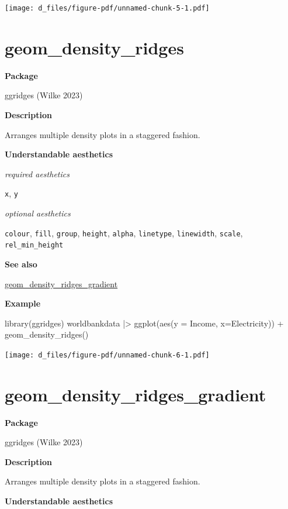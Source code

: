 \documentclass[
  letterpaper,
  DIV=11,
  numbers=noendperiod]{scrreprt}
\newenvironment{Shaded}{\begin{snugshade}}{\end{snugshade}}
\newcommand{\AttributeTok}[1]{\textcolor[rgb]{0.40,0.45,0.13}{#1}}
\newcommand{\FunctionTok}[1]{\textcolor[rgb]{0.28,0.35,0.67}{#1}}
\newcommand{\NormalTok}[1]{\textcolor[rgb]{0.00,0.23,0.31}{#1}}
\newcommand{\SpecialCharTok}[1]{\textcolor[rgb]{0.37,0.37,0.37}{#1}}
\begin{document}
\texttt{[image: d\_files/figure-pdf/unnamed-chunk-5-1.pdf]}

\section{geom\_density\_ridges}\label{density_ridges}

\textbf{Package}

ggridges (Wilke 2023)

\textbf{Description}

Arranges multiple density plots in a staggered fashion.

\textbf{Understandable aesthetics}

\emph{required aesthetics}

\texttt{x}, \texttt{y}

\emph{optional aesthetics}

\texttt{colour}, \texttt{fill}, \texttt{group}, \texttt{height},
\texttt{alpha}, \texttt{linetype}, \texttt{linewidth}, \texttt{scale},
\texttt{rel\_min\_height}

\textbf{See also}

\hyperref[density_ridges_gradient]{geom\_density\_ridges\_gradient}

\textbf{Example}

\begin{Shaded}
\begin{Highlighting}[]
\FunctionTok{library}\NormalTok{(ggridges)}
\NormalTok{ worldbankdata }\SpecialCharTok{|\textgreater{}}
  \FunctionTok{ggplot}\NormalTok{(}\FunctionTok{aes}\NormalTok{(}\AttributeTok{y =}\NormalTok{ Income, }\AttributeTok{x=}\NormalTok{Electricity)) }\SpecialCharTok{+}   
  \FunctionTok{geom\_density\_ridges}\NormalTok{() }
\end{Highlighting}
\end{Shaded}

\texttt{[image: d\_files/figure-pdf/unnamed-chunk-6-1.pdf]}

\section{geom\_density\_ridges\_gradient}\label{density_ridges_gradient}

\textbf{Package}

ggridges (Wilke 2023)

\textbf{Description}

Arranges multiple density plots in a staggered fashion.

\textbf{Understandable aesthetics}
\end{document}
